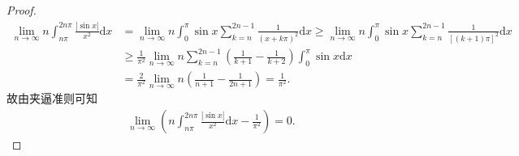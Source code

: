 \documentclass[../../main.tex]{subfiles}
\begin{document}
\begin{proof}
\begin{align*}
\lim_{n \to \infty} n \int_{n\pi}^{2n\pi} \frac{|\sin x|}{x^2} \mathrm{d}x &= \lim_{n \to \infty} n \int_0^{\pi} \sin x \sum_{k=n}^{2n - 1} \frac{1}{(x + k\pi)^2} \mathrm{d}x \geqslant  \lim_{n \to \infty} n \int_0^{\pi} \sin x \sum_{k=n}^{2n - 1} \frac{1}{[(k + 1)\pi]^2} \mathrm{d}x 
\\
&\geqslant  \frac{1}{\pi^2} \lim_{n \to \infty} n \sum_{k=n}^{2n - 1} \left( \frac{1}{k + 1} - \frac{1}{k + 2} \right) \int_0^{\pi} \sin x \mathrm{d}x \\
&= \frac{2}{\pi^2} \lim_{n \to \infty} n \left( \frac{1}{n + 1} - \frac{1}{2n + 1} \right) = \frac{1}{\pi^2}.
\end{align*}
故由夹逼准则可知
\begin{align*}
\lim_{n \to \infty} \left( n \int_{n\pi}^{2n\pi} \frac{|\sin x|}{x^2} \mathrm{d}x - \frac{1}{\pi^2} \right) = 0.
\end{align*}
\end{proof}
\end{document}
